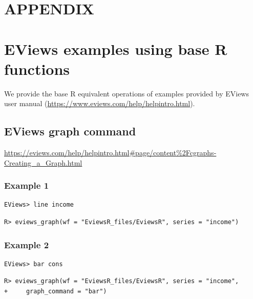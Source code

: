 \clearpage

\appendix

\hypertarget{appendix}{%
\section*{APPENDIX}\label{appendix}}

\hypertarget{eviews-examples-using-base-r-functions}{%
\section{EViews examples using base R functions}\label{eviews-examples-using-base-r-functions}}

We provide the base R equivalent operations of examples provided by EViews user manual (\url{https://www.eviews.com/help/helpintro.html}).

\hypertarget{eviews-graph-command}{%
\subsection{EViews graph command}\label{eviews-graph-command}}

\url{https://eviews.com/help/helpintro.html\#page/content\%2Fcgraphs-Creating_a_Graph.html}

\hypertarget{example-1}{%
\subsubsection{Example 1}\label{example-1}}

\begin{verbatim}
EViews> line income
\end{verbatim}

\begin{verbatim}
R> eviews_graph(wf = "EviewsR_files/EviewsR", series = "income")
\end{verbatim}

\hypertarget{example-2}{%
\subsubsection{Example 2}\label{example-2}}

\begin{verbatim}
EViews> bar cons
\end{verbatim}

\begin{verbatim}
R> eviews_graph(wf = "EviewsR_files/EviewsR", series = "income",
+     graph_command = "bar")
\end{verbatim}

